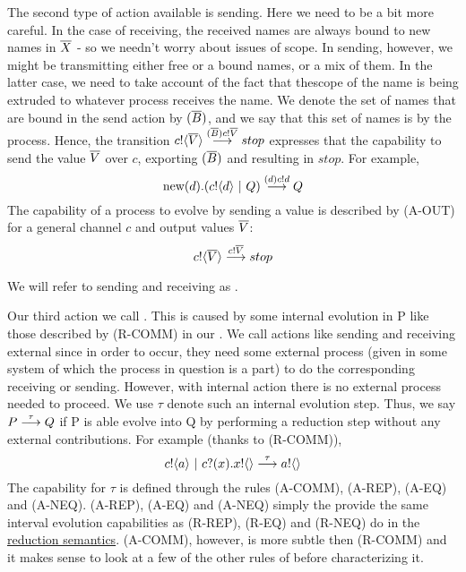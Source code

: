 The second type of action available is sending.  
Here we need to be a bit more careful.  
In the case of receiving, the received names are always bound to new names in $\overline{X}$ - so we needn't worry about issues of scope.  
In sending, however, we might be transmitting either free or a bound names, or a mix of them.  
In the latter case, we need to take account of the fact that thescope of the name is being extruded to whatever process receives the name.  
We denote the set of names that are bound in the send action by $({\overline{B}})$, and we say that this set of names is  by the process.  
Hence, the transition ${c}!\langle{ \ensuremath{\overline{V}} }\rangle \overset{{({\overline{B}}){c}!{\overline{V}}}}{\longrightarrow} stop$ expresses that the capability to send the value $\overline{V}$ over $c$, exporting $({\overline{B}})$ and resulting in $stop$.  
For example,
\[
	\text{new}({d}).({c}!\langle{d}\rangle \ |\  Q) \overset{{({d}){c}!{d}}}{\longrightarrow} Q
\]
The capability of a process to evolve by sending a value is described by (A-OUT) for a general channel $c$ and output values $\overline{V}$:
\[
	{c}!\langle{ \ensuremath{\overline{V}} }\rangle \overset{{{c}!{\overline{V}}}}{\longrightarrow} stop 
\]

We will refer to sending and receiving as .

Our third action we call . 
This is caused by some internal evolution in P like those described by (R-COMM) in our .  
We call actions like sending and receiving external since in order to occur, they need some external process (given in some system of which the process in question is a part) to do the corresponding receiving or sending.  
However, with internal action there is no external process needed to proceed.  
We use $\tau$ denote such an internal evolution step.  
Thus, we say $P \overset{{\tau}}{\longrightarrow} Q$ if P is able evolve into Q by performing a reduction step without any external contributions.  
For example (thanks to (R-COMM)),
\[
	{c}!\langle{a}\rangle \ |\  {c}?({x}).{x}!\langle{}\rangle \overset{{\tau}}{\longrightarrow} {a}!\langle{}\rangle 
\]
The capability for $\tau$ is defined through the rules (A-COMM), (A-REP), (A-EQ) and (A-NEQ).  (A-REP), (A-EQ) and (A-NEQ) simply the provide the same interval evolution capabilities as (R-REP), (R-EQ) and (R-NEQ) do in the \hyperref[secreducationsemantics]{reduction semantics}. (A-COMM), however, is more subtle then (R-COMM) and it makes sense to look at a few of the other rules of  before characterizing it.


